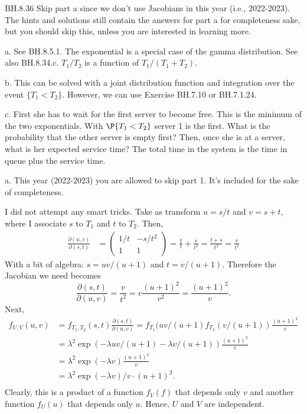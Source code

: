 
\setcounter{theorem}{35}
\begin{exercise} BH.8.36 Skip part a since we don't use Jacobians in this year (i.e., 2022-2023).
The hints and solutions still contain the answers for part a for completeness sake, but you should
skip this, unless you are interested in learning more.

\begin{hint}
a. See BH.8.5.1. The exponential is a special case of the gamma distribution. See also BH.8.34.c. $T_1/T_2$ is a function of $T_1/(T_1+T_2)$.

b. This can be solved with a joint distribution function and integration over the event $\{T_1<T_2\}$. However, we can use Exercise BH.7.10 or BH.7.1.24.

c. First she has to wait for the first server to become free. This is the minimum of the two exponentials.
With $\P{T_1<T_2}$ server 1 is the first.
What is the probability that the other server is empty first? Then, once she is at a server, what is her expected service time? The total time in the system is the time in queue plus the service time.
\end{hint}
\begin{solution}
a. This year (2022-2023) you are allowed to skip part 1. It's included for the sake of completeness.

I did not attempt any smart tricks. Take as transform $u=s/t$ and $v=s+t$, where I associate $s$ to $T_{1}$ and $t$  to $T_2$. Then,
\begin{align*}
\frac{\partial (u,v)}{\partial (s,t)} &=
  \begin{pmatrix}
    1/t & -s/t^{2} \\
1 & 1
  \end{pmatrix} = \frac 1 t + \frac{s}{t^{2}} = \frac{t+s}{t^{2}} = \frac{v}{t^{2}}
\end{align*}
With a bit of algebra: $s=uv/(u+1)$ and $t=v/(u+1)$.
Therefore the Jacobian we need becomes
\begin{equation}
\label{eq:12}
\frac{\partial (s,t)}{\partial (u,v)} = \frac{v}{t^{2}} = v \frac{(u+1)^2}{v^{2}} = \frac{(u+1)^{2}}{v}.
\end{equation}
Next,
\begin{align*}
  f_{U, V}(u,v) &= f_{T_1,T_2}(s,t) \frac{\partial (s,t)}{\partial (u,v)}
  =  f_{T_1}(uv/(u+1) f_{T_2}(v/(u+1)) \frac{(u+1)^{2}}{v} \\
  &=  \lambda^{2} \exp(-\lambda uv/(u+1) - \lambda v/(u+1)) \frac{(u+1)^{2}}{v} \\
  &=  \lambda^{2} \exp(-\lambda v) \frac{(u+1)^{2}}{v} \\
  &=  \lambda^{2} \exp(-\lambda v)/v \cdot  (u+1)^{2}. \\
\end{align*}
Clearly, this is a product of a function $f_{V}(f)$ that depends only  $v$ and another function $f_U(u)$ that depends  only $u$. Hence, $U$ and $V$ are independent.


\end{solution}
\end{exercise}
